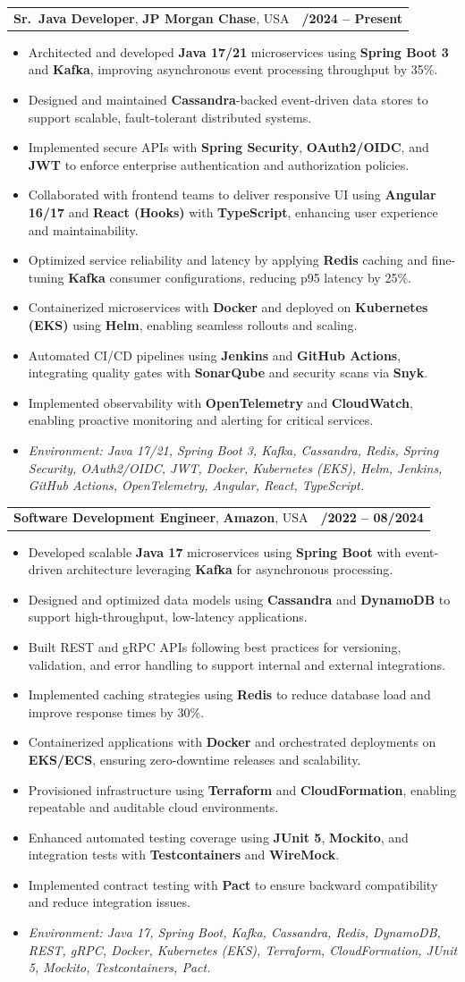 \documentclass[letterpaper,11pt]{article}
\makeatletter
\newcommand{\resumeItem}[1]{
  \item\footnotesize{
    {#1 \vspace{-2pt}}
  }
}
\newcommand{\resumeSubheading}[4]{
  \vspace{-2pt}\item
    \begin{tabular*}{1.0\textwidth}[t]{l@{\extracolsep{\fill}}r}
      \textbf{\fontsize{10pt}{14pt}\selectfont #3}, \textbf{\fontsize{10pt}{14pt}\selectfont #1}, \fontsize{10pt}{14pt}\selectfont #4 & \textbf{\fontsize{10pt}{14pt}\selectfont #2} \\
    \end{tabular*}\vspace{-7pt}
}
\newcommand{\resumeItemListStart}{\begin{itemize}[leftmargin=*]}
\newcommand{\resumeItemListEnd}{\end{itemize}\vspace{-5pt}}
\makeatother
\begin{document}
\resumeSubheading
{JP Morgan Chase}{09/2024 -- Present}
{Sr.\ Java Developer}{USA}
\resumeItemListStart
  \resumeItem{Architected and developed \textbf{Java 17/21} microservices using \textbf{Spring Boot 3} and \textbf{Kafka}, improving asynchronous event processing throughput by 35\%.}
  \resumeItem{Designed and maintained \textbf{Cassandra}-backed event-driven data stores to support scalable, fault-tolerant distributed systems.}
  \resumeItem{Implemented secure APIs with \textbf{Spring Security}, \textbf{OAuth2/OIDC}, and \textbf{JWT} to enforce enterprise authentication and authorization policies.}
  \resumeItem{Collaborated with frontend teams to deliver responsive UI using \textbf{Angular 16/17} and \textbf{React (Hooks)} with \textbf{TypeScript}, enhancing user experience and maintainability.}
  \resumeItem{Optimized service reliability and latency by applying \textbf{Redis} caching and fine-tuning \textbf{Kafka} consumer configurations, reducing p95 latency by 25\%.}
  \resumeItem{Containerized microservices with \textbf{Docker} and deployed on \textbf{Kubernetes (EKS)} using \textbf{Helm}, enabling seamless rollouts and scaling.}
  \resumeItem{Automated CI/CD pipelines using \textbf{Jenkins} and \textbf{GitHub Actions}, integrating quality gates with \textbf{SonarQube} and security scans via \textbf{Snyk}.}
  \resumeItem{Implemented observability with \textbf{OpenTelemetry} and \textbf{CloudWatch}, enabling proactive monitoring and alerting for critical services.}
  \resumeItem{\textit{Environment: Java 17/21, Spring Boot 3, Kafka, Cassandra, Redis, Spring Security, OAuth2/OIDC, JWT, Docker, Kubernetes (EKS), Helm, Jenkins, GitHub Actions, OpenTelemetry, Angular, React, TypeScript.}}
\resumeItemListEnd

\resumeSubheading
{Amazon}{10/2022 -- 08/2024}
{Software Development Engineer}{USA}
\resumeItemListStart
  \resumeItem{Developed scalable \textbf{Java 17} microservices using \textbf{Spring Boot} with event-driven architecture leveraging \textbf{Kafka} for asynchronous processing.}
  \resumeItem{Designed and optimized data models using \textbf{Cassandra} and \textbf{DynamoDB} to support high-throughput, low-latency applications.}
  \resumeItem{Built REST and gRPC APIs following best practices for versioning, validation, and error handling to support internal and external integrations.}
  \resumeItem{Implemented caching strategies using \textbf{Redis} to reduce database load and improve response times by 30\%.}
  \resumeItem{Containerized applications with \textbf{Docker} and orchestrated deployments on \textbf{EKS/ECS}, ensuring zero-downtime releases and scalability.}
  \resumeItem{Provisioned infrastructure using \textbf{Terraform} and \textbf{CloudFormation}, enabling repeatable and auditable cloud environments.}
  \resumeItem{Enhanced automated testing coverage using \textbf{JUnit 5}, \textbf{Mockito}, and integration tests with \textbf{Testcontainers} and \textbf{WireMock}.}
  \resumeItem{Implemented contract testing with \textbf{Pact} to ensure backward compatibility and reduce integration issues.}
  \resumeItem{\textit{Environment: Java 17, Spring Boot, Kafka, Cassandra, Redis, DynamoDB, REST, gRPC, Docker, Kubernetes (EKS), Terraform, CloudFormation, JUnit 5, Mockito, Testcontainers, Pact.}}
\resumeItemListEnd
\end{document}
